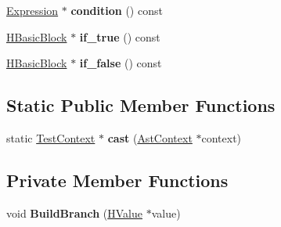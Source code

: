 \begin{DoxyCompactItemize}
\item 
\hyperlink{classv8_1_1internal_1_1_expression}{Expression} $\ast$ {\bfseries condition} () const \hypertarget{classv8_1_1internal_1_1_test_context_a73e65dd10ab1e15215a156841f8cbc64}{}\label{classv8_1_1internal_1_1_test_context_a73e65dd10ab1e15215a156841f8cbc64}

\item 
\hyperlink{classv8_1_1internal_1_1_h_basic_block}{H\+Basic\+Block} $\ast$ {\bfseries if\+\_\+true} () const \hypertarget{classv8_1_1internal_1_1_test_context_aff092812fbf854ec485d11a7581bd773}{}\label{classv8_1_1internal_1_1_test_context_aff092812fbf854ec485d11a7581bd773}

\item 
\hyperlink{classv8_1_1internal_1_1_h_basic_block}{H\+Basic\+Block} $\ast$ {\bfseries if\+\_\+false} () const \hypertarget{classv8_1_1internal_1_1_test_context_a6f26055fcfb6ba0add744dd4a88d0f01}{}\label{classv8_1_1internal_1_1_test_context_a6f26055fcfb6ba0add744dd4a88d0f01}

\end{DoxyCompactItemize}
\subsection*{Static Public Member Functions}
\begin{DoxyCompactItemize}
\item 
static \hyperlink{classv8_1_1internal_1_1_test_context}{Test\+Context} $\ast$ {\bfseries cast} (\hyperlink{classv8_1_1internal_1_1_ast_context}{Ast\+Context} $\ast$context)\hypertarget{classv8_1_1internal_1_1_test_context_af90569769d06692dd22ef8ee87259da1}{}\label{classv8_1_1internal_1_1_test_context_af90569769d06692dd22ef8ee87259da1}

\end{DoxyCompactItemize}
\subsection*{Private Member Functions}
\begin{DoxyCompactItemize}
\item 
void {\bfseries Build\+Branch} (\hyperlink{classv8_1_1internal_1_1_h_value}{H\+Value} $\ast$value)\hypertarget{classv8_1_1internal_1_1_test_context_ae46c72d7206766b5818073c2168f96a6}{}\label{classv8_1_1internal_1_1_test_context_ae46c72d7206766b5818073c2168f96a6}

\end{DoxyCompactItemize}
